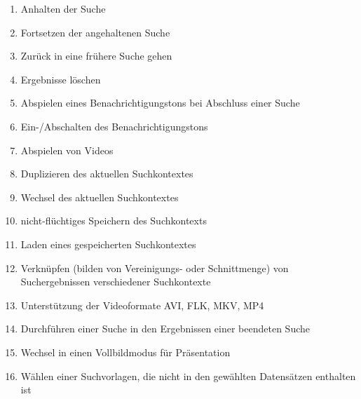 \begin{enumerate} [label=\bfseries /F \arabic*0/]
	\subsection{Wunsch}
	\item Anhalten der Suche 	%
	\item Fortsetzen der angehaltenen Suche 	%
	\item Zurück in eine frühere Suche gehen %
	\item Ergebnisse löschen %
	\item Abspielen eines Benachrichtigungstons bei Abschluss einer Suche
	\item Ein-/Abschalten des Benachrichtigungstons
	\item Abspielen von Videos
	\item Duplizieren des aktuellen Suchkontextes
	\item Wechsel des aktuellen Suchkontextes %
	\item nicht-fl\"uchtiges Speichern des Suchkontexts
	\item Laden eines gespeicherten Suchkontextes
	\item Verkn\"upfen (bilden von Vereinigungs- oder Schnittmenge) von Suchergebnissen verschiedener Suchkontexte
	\item Unterstützung der Videoformate AVI, FLK, MKV, MP4
	\item Durchführen einer Suche in den Ergebnissen einer beendeten Suche
	\item Wechsel in einen Vollbildmodus für Präsentation
	\item Wählen einer Suchvorlagen, die nicht in den gewählten Datensätzen enthalten ist
\end{enumerate}
